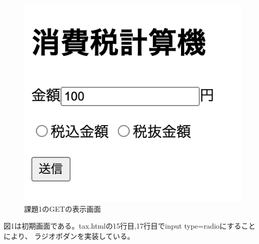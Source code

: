 \documentclass[12pt]{jarticle}
\begin{document}
\clearpage

\begin{figure}[h]
    \begin{center}
        \includegraphics[scale=0.2]{kadai2_1_1.png}
    \end{center}
    \caption{課題1のGETの表示画面}
\end{figure}
図1は初期画面である。tax.htmlの15行目,17行目でinput type=radioにすることにより、
ラジオボダンを実装している。
\end{document}

